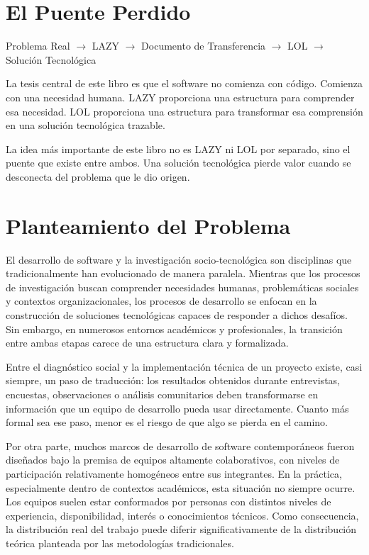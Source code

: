 \documentclass[14pt,a4paper,oneside]{extbook}
\begin{document}
\chapter{El Puente Perdido}

\begin{keyquestion}
Problema Real $\rightarrow$ LAZY $\rightarrow$ Documento de Transferencia $\rightarrow$ LOL $\rightarrow$ Solución Tecnológica
\end{keyquestion}

La tesis central de este libro es que el software no comienza con código.
Comienza con una necesidad humana. LAZY proporciona una estructura para comprender
esa necesidad. LOL proporciona una estructura para transformar esa comprensión en una
solución tecnológica trazable.

\begin{authorobservation}
La idea más importante de este libro no es LAZY ni LOL por separado, sino el puente que
existe entre ambos. Una solución tecnológica pierde valor cuando se desconecta del problema
que le dio origen.
\end{authorobservation}



\chapter{Planteamiento del Problema}

El desarrollo de software y la investigación socio-tecnológica son disciplinas que tradicionalmente han evolucionado de manera paralela. Mientras que los procesos de investigación buscan comprender necesidades humanas, problemáticas sociales y contextos organizacionales, los procesos de desarrollo se enfocan en la construcción de soluciones tecnológicas capaces de responder a dichos desafíos. Sin embargo, en numerosos entornos académicos y profesionales, la transición entre ambas etapas carece de una estructura clara y formalizada.

Entre el diagnóstico social y la implementación técnica de un proyecto existe, casi siempre, un paso de traducción: los resultados obtenidos durante entrevistas, encuestas, observaciones o análisis comunitarios deben transformarse en información que un equipo de desarrollo pueda usar directamente. Cuanto más formal sea ese paso, menor es el riesgo de que algo se pierda en el camino.

Por otra parte, muchos marcos de desarrollo de software contemporáneos fueron diseñados bajo la premisa de equipos altamente colaborativos, con niveles de participación relativamente homogéneos entre sus integrantes. En la práctica, especialmente dentro de contextos académicos, esta situación no siempre ocurre. Los equipos suelen estar conformados por personas con distintos niveles de experiencia, disponibilidad, interés o conocimientos técnicos. Como consecuencia, la distribución real del trabajo puede diferir significativamente de la distribución teórica planteada por las metodologías tradicionales.
\end{document}
